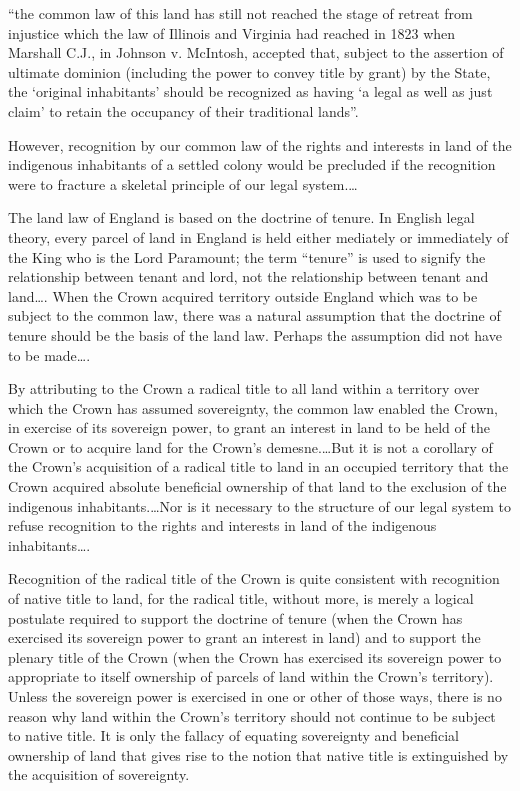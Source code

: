 ``the common law of this land has still not reached the stage of retreat from
injustice which the law of Illinois and Virginia had reached in 1823 when
Marshall C.J., in Johnson v. McIntosh, accepted that, subject to the assertion
of ultimate dominion (including the power to convey title by grant) by the
State, the `original inhabitants' should be recognized as having `a legal as
well as just claim' to retain the occupancy of their traditional lands''.

However, recognition by our common law of the rights and interests in land of
the indigenous inhabitants of a settled colony would be precluded if the
recognition were to fracture a skeletal principle of our legal system.\ldots

The land law of England is based on the doctrine of tenure. In English legal
theory, every parcel of land in England is held either mediately or immediately
of the King who is the Lord Paramount; the term ``tenure'' is used to signify
the relationship between tenant and lord, not the relationship between tenant
and land\ldots . When the Crown acquired territory outside England which was to
be subject to the common law, there was a natural assumption that the doctrine
of tenure should be the basis of the land law. Perhaps the assumption did not
have to be made\ldots .

By attributing to the Crown a radical title to all land within a territory over which the Crown has assumed
sovereignty, the common law enabled the Crown, in exercise of its sovereign
power, to grant an interest in land to be held of the Crown or to acquire land
for the Crown's demesne.\ldots But it is not a corollary of the Crown's
acquisition of a radical title to land in an occupied territory that the Crown
acquired absolute beneficial ownership of that land to the exclusion of the
indigenous inhabitants.\ldots Nor is it necessary to the structure of our legal
system to refuse recognition to the rights and interests in land of the
indigenous inhabitants\ldots .

Recognition of the radical title of the Crown is quite consistent with
recognition of native title to land, for the radical title, without more, is
merely a logical postulate required to support the doctrine of tenure (when the
Crown has exercised its sovereign power to grant an interest in land) and to
support the plenary title of the Crown (when the Crown has exercised its
sovereign power to appropriate to itself ownership of parcels of land within the
Crown's territory). Unless the sovereign power is exercised in one or other of
those ways, there is no reason why land within the Crown's territory should not
continue to be subject to native title. It is only the fallacy of equating
sovereignty and beneficial ownership of land that gives rise to the notion that
native title is extinguished by the acquisition of sovereignty. 

